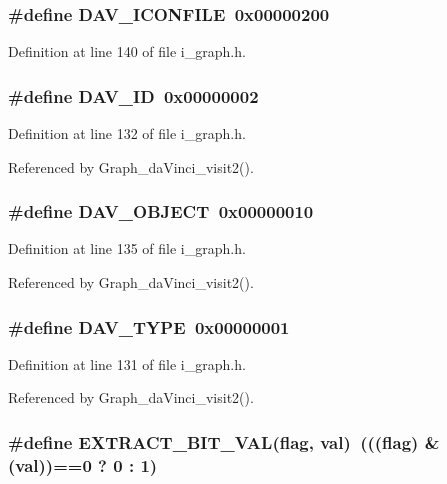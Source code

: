\subsubsection{\setlength{\rightskip}{0pt plus 5cm}\#define DAV\_\-ICONFILE~0x00000200}\label{i__graph_8h_371d815fce249a6c280a8c738f4778d2}




Definition at line 140 of file i\_\-graph.h.
\subsubsection{\setlength{\rightskip}{0pt plus 5cm}\#define DAV\_\-ID~0x00000002}\label{i__graph_8h_bc71151592c0d0f03b4c81a6c9d45fa1}




Definition at line 132 of file i\_\-graph.h.

Referenced by Graph\_\-da\-Vinci\_\-visit2().
\subsubsection{\setlength{\rightskip}{0pt plus 5cm}\#define DAV\_\-OBJECT~0x00000010}\label{i__graph_8h_6ce5d0beb93802b0cdf56e6b8b379c17}




Definition at line 135 of file i\_\-graph.h.

Referenced by Graph\_\-da\-Vinci\_\-visit2().
\subsubsection{\setlength{\rightskip}{0pt plus 5cm}\#define DAV\_\-TYPE~0x00000001}\label{i__graph_8h_fce4bc2be1dd151edf1f35b381889da9}




Definition at line 131 of file i\_\-graph.h.

Referenced by Graph\_\-da\-Vinci\_\-visit2().
\subsubsection{\setlength{\rightskip}{0pt plus 5cm}\#define EXTRACT\_\-BIT\_\-VAL(flag, val)~(((flag) \& (val))==0 ? 0 : 1)}\label{i__graph_8h_21a3ca7a8afa2ba98db7e08bc9c81b0c}




